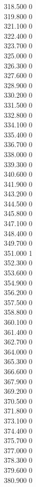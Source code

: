 { 318.500	0 \\
 319.800	0 \\
 321.100	0 \\
 322.400	0 \\
 323.700	0 \\
 325.000	0 \\
 326.300	0 \\
 327.600	0 \\
 328.900	0 \\
 330.200	0 \\
 331.500	0 \\
 332.800	0 \\
 334.100	0 \\
 335.400	0 \\
 336.700	0 \\
 338.000	0 \\
 339.300	0 \\
 340.600	0 \\
 341.900	0 \\
 343.200	0 \\
 344.500	0 \\
 345.800	0 \\
 347.100	0 \\
 348.400	0 \\
 349.700	0 \\
 351.000	1 \\
 352.300	0 \\
 353.600	0 \\
 354.900	0 \\
 356.200	0 \\
 357.500	0 \\
 358.800	0 \\
 360.100	0 \\
 361.400	0 \\
 362.700	0 \\
 364.000	0 \\
 365.300	0 \\
 366.600	0 \\
 367.900	0 \\
 369.200	0 \\
 370.500	0 \\
 371.800	0 \\
 373.100	0 \\
 374.400	0 \\
 375.700	0 \\
 377.000	0 \\
 378.300	0 \\
 379.600	0 \\
 380.900	0 \\
}
